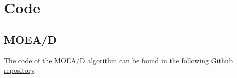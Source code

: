 \chapter{Code}
\section{MOEA/D}
The code of the MOEA/D algorithm can be found in the following Github \href{https://github.com/marreA/MPP_TFM}{repository}.